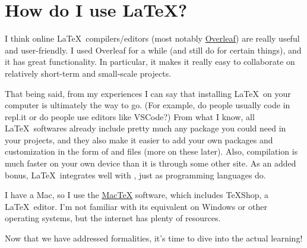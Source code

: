 \section{How do I use \LaTeX?}
I think online \LaTeX\ compilers/editors (most notably \href{http://www.overleaf.com}{Overleaf}) are really useful and user-friendly. I used Overleaf for a while (and still do for certain things), and it has great functionality. In particular, it makes it really easy to collaborate on relatively short-term and small-scale projects. 

That being said, from my experiences I can say that installing \LaTeX\ on your computer is ultimately the way to go. (For example, do people usually code in repl.it or do people use editors like VSCode?) From what I know, all \LaTeX\ softwares already include pretty much any package you could need in your projects, and they also make it easier to add your own packages and customization in the form of  and  files (more on these later). Also, compilation is much faster on your own device than it is through some other site. As an added bonus, \LaTeX\ integrates well with , just as programming languages do.

I have a Mac, so I use the \href{https://www.tug.org/mactex/}{Mac\TeX} software, which includes \TeX Shop, a \LaTeX\ editor. I'm not familiar with its equivalent on Windows or other operating systems, but the internet has plenty of resources.

\hrulefill

Now that we have addressed formalities, it's time to dive into the actual learning!

